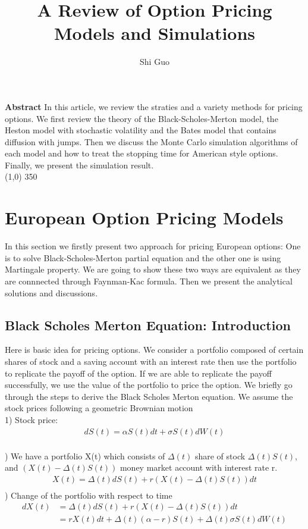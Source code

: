 \documentclass[a4paper]{article}
\title{A Review of Option Pricing Models and Simulations}
\author{Shi Guo}
\begin{document}
\maketitle
{\bf Abstract} In this article, we review the straties and a variety methods for pricing options. We first review the theory of the Black-Scholes-Merton model, the Heston model with stochastic volatility and the Bates model that contains diffusion with jumps. Then we discuss the Monte Carlo simulation algorithms of each model and how to treat the stopping time for American style options. Finally, we present the simulation result. \\
\line(1,0) {350}
\section{European Option Pricing Models}
In this section we firstly present two approach for pricing European options: One is to solve Black-Scholes-Merton partial equation and the other one is using Martingale property. We are going to show these two ways are equivalent as they are connnected through Faynman-Kac formula. Then we present the analytical solutions and discussions. 
\subsection{Black Scholes Merton Equation: Introduction}
Here is basic idea for pricing options. We consider a portfolio composed of certain shares of stock and a saving account with an interest rate then use the portfolio to replicate the payoff of the option. If we are able to replicate the payoff successfully, we use the value of the portfolio to price the option. We briefly go through the steps to derive the Black Scholes Merton equation. We assume the stock prices following a geometric Brownian motion\\
1) Stock price:\\
\begin{align*}
	 dS(t) = \alpha S(t) dt + \sigma S(t) dW(t)\\
\end{align*}
 
) We have a portfolio X(t) which consists of $\Delta(t)$ share of stock  $\Delta(t) S(t)$, and $(X(t) - \Delta (t) S(t))$ money market account with interest rate r. \\  
\begin{align*}
	X(t) = \Delta(t) dS(t) + r(X(t) -\Delta(t) S(t)) dt\\
\end{align*}
) Change of the portfolio with respect to time
\begin{align*}
	  d X(t) & = \Delta(t) d S(t) + r(X(t) - \Delta(t) S(t)) dt \\
             & = r X(t) dt + \Delta(t) (\alpha - r )S(t) + \Delta (t) \sigma S(t) d W(t) \\
\end{align*}
                      
\end{document}
